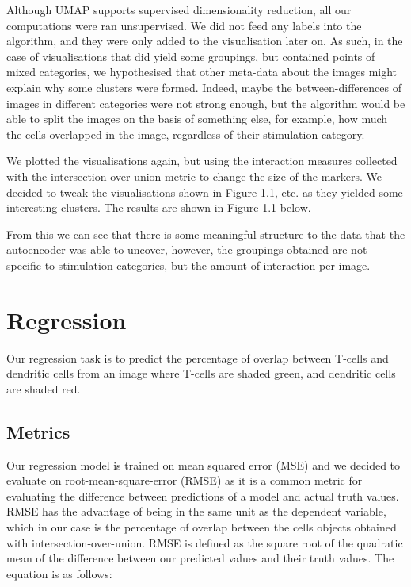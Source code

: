 Although UMAP supports supervised dimensionality reduction, all our computations were ran unsupervised. We did not feed any labels into the algorithm, and they were only added to the visualisation later on. As such, in the case of visualisations that did yield some groupings, but contained points of mixed categories, we hypothesised that other meta-data about the images might explain why some clusters were formed. Indeed, maybe the between-differences of images in different categories were not strong enough, but the algorithm would be able to split the images on the basis of something else, for example, how much the cells overlapped in the image, regardless of their stimulation category.

We plotted the visualisations again, but using the interaction measures collected with the intersection-over-union metric to change the size of the markers. We decided to tweak the visualisations shown in Figure \ref{}, etc. as they yielded some interesting clusters. The results are shown in Figure \ref{} below.

From this we can see that there is some meaningful structure to the data that the autoencoder was able to uncover, however, the groupings obtained are not specific to stimulation categories, but the amount of interaction per image.

\section{Regression}

Our regression task is to predict the percentage of overlap between T-cells and dendritic cells from an image where T-cells are shaded green, and dendritic cells are shaded red.

\subsection{Metrics}

Our regression model is trained on mean squared error (MSE) and we decided to evaluate on root-mean-square-error (RMSE) as it is a common metric for evaluating the difference between predictions of a model and actual truth values. RMSE has the advantage of being in the same unit as the dependent variable, which in our case is the percentage of overlap between the cells objects obtained with intersection-over-union. RMSE is defined as the square root of the quadratic mean of the difference between our predicted values and their truth values. The equation is as follows:


